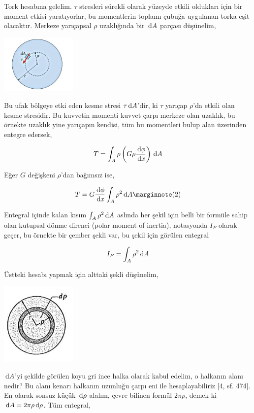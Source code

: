 \documentclass[12pt,fleqn]{article}\usepackage{../../common}
\begin{document}
Tork hesabına gelelim. $\tau$ stresleri sürekli olarak yüzeyde etkili oldukları
için bir moment etkisi yaratıyorlar, bu momentlerin toplamı çubuğa uygulanan
torka eşit olacaktır. Merkeze yarıçapsal $\rho$ uzaklığında bir $\,\mathrm{d} A$ parçası
düşünelim,

\includegraphics[width=10em]{phy_020_strs_06_04.jpg}

Bu ufak bölgeye etki eden kesme stresi $\tau \,\mathrm{d} A$'dir, ki $\tau$ yarıçap
$\rho$'da etkili olan kesme stresidir. Bu kuvvetin momenti kuvvet çarpı
merkeze olan uzaklık, bu örnekte uzaklık yine yarıçapın kendisi, tüm bu
momentleri bulup alan üzerinden entegre edersek,

$$
T = \int_A \rho \left( G \rho \frac{\,\mathrm{d} \phi}{\,\mathrm{d} x} \right) \,\mathrm{d} A
$$

Eğer $G$ değişkeni $\rho$'dan bağımsız ise, 

$$
T = G \frac{\ud \phi}{\ud x} \int_A \rho^2 \ud A
\mlabel{2}
$$

Entegral içinde kalan kısım $\int_A \rho^2 \,\mathrm{d} A$ aslında her şekil için belli
bir formüle sahip olan kutupsal dönme direnci (polar moment of inertia),
notasyonda $I_P$ olarak geçer, bu örnekte bir çember şekli var, bu şekil için
görülen entegral

$$
I_P = \int_A \rho^2 \,\mathrm{d} A
$$

Üstteki hesabı yapmak için alttaki şekli düşünelim, 

\includegraphics[width=10em]{phy_020_strs_06_05.jpg}

$\,\mathrm{d} A$'yi şekilde görülen koyu gri ince halka olarak kabul edelim, o halkanın
alanı nedir? Bu alanı kenarı halkanın uzunluğu çarpı eni ile hesaplayabiliriz
[4, sf. 474]. En olarak sonsuz küçük $\,\mathrm{d} \rho$ alalım, çevre bilinen formül
$2\pi\rho$, demek ki $\,\mathrm{d} A = 2\pi\rho \,\mathrm{d} \rho$. Tüm entegral,
\end{document}
